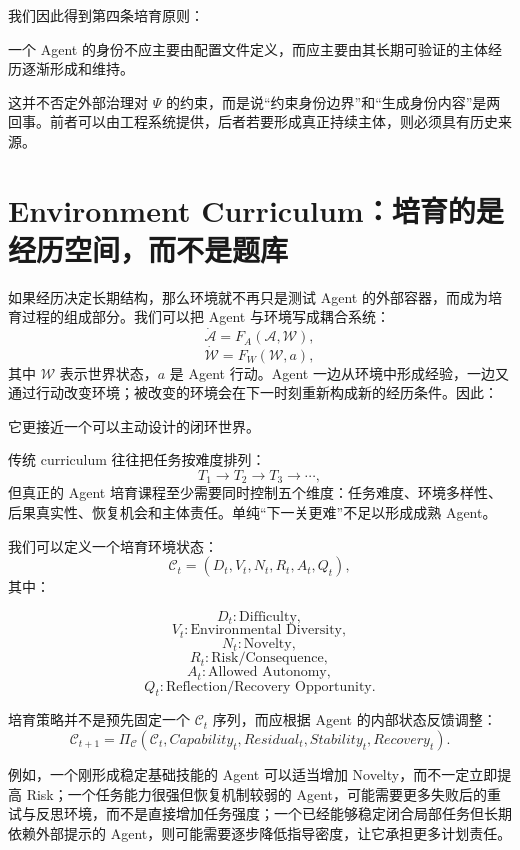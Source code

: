 我们因此得到第四条培育原则：
\begin{proposition*}
一个 Agent 的身份不应主要由配置文件定义，而应主要由其长期可验证的主体经历逐渐形成和维持。
\end{proposition*}

这并不否定外部治理对 $\Psi$ 的约束，而是说“约束身份边界”和“生成身份内容”是两回事。前者可以由工程系统提供，后者若要形成真正持续主体，则必须具有历史来源。

\section{Environment Curriculum：培育的是经历空间，而不是题库}

如果经历决定长期结构，那么环境就不再只是测试 Agent 的外部容器，而成为培育过程的组成部分。我们可以把 Agent 与环境写成耦合系统：
\[
\dot{\mathcal A}
=
F_A(\mathcal A,\mathcal W),
\]
\[
\dot{\mathcal W}
=
F_W(\mathcal W,a),
\]
其中 $\mathcal W$ 表示世界状态，$a$ 是 Agent 行动。Agent 一边从环境中形成经验，一边又通过行动改变环境；被改变的环境会在下一时刻重新构成新的经历条件。因此：

\begin{statementbox}
\centering
{}
\end{statementbox}

它更接近一个可以主动设计的闭环世界。

传统 curriculum 往往把任务按难度排列：
\[
T_1\rightarrow T_2\rightarrow T_3\rightarrow\cdots,
\]
但真正的 Agent 培育课程至少需要同时控制五个维度：任务难度、环境多样性、后果真实性、恢复机会和主体责任。单纯“下一关更难”不足以形成成熟 Agent。

我们可以定义一个培育环境状态：
\[
\mathcal C_t
=
(
D_t,
V_t,
N_t,
R_t,
A_t,
Q_t
),
\]
其中：

\[
D_t:
\text{Difficulty},
\]
\[
V_t:
\text{Environmental Diversity},
\]
\[
N_t:
\text{Novelty},
\]
\[
R_t:
\text{Risk/Consequence},
\]
\[
A_t:
\text{Allowed Autonomy},
\]
\[
Q_t:
\text{Reflection/Recovery Opportunity}.
\]

培育策略并不是预先固定一个 $\mathcal C_t$ 序列，而应根据 Agent 的内部状态反馈调整：
\[
\mathcal C_{t+1}
=
\Pi_{\mathcal C}
\left(
\mathcal C_t,
Capability_t,
Residual_t,
Stability_t,
Recovery_t
\right).
\]

例如，一个刚形成稳定基础技能的 Agent 可以适当增加 Novelty，而不一定立即提高 Risk；一个任务能力很强但恢复机制较弱的 Agent，可能需要更多失败后的重试与反思环境，而不是直接增加任务强度；一个已经能够稳定闭合局部任务但长期依赖外部提示的 Agent，则可能需要逐步降低指导密度，让它承担更多计划责任。

